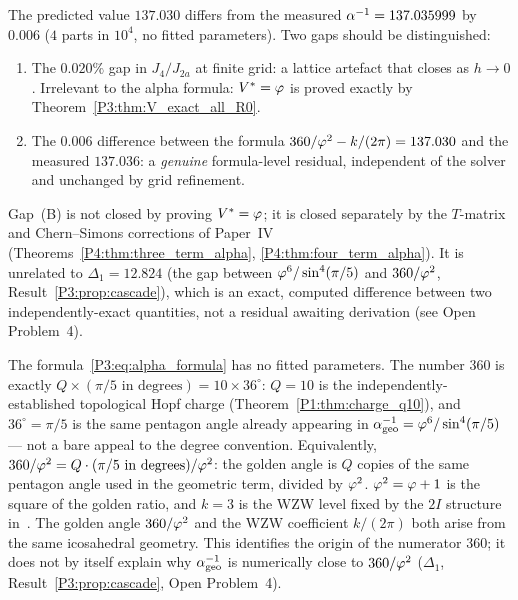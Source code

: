 \begin{remark}
\label{P3:rem:residual_status}
The predicted value $137.030$ differs from the measured $\alpha^{-1} = 137.035999$
by $0.006$ ($4$ parts in $10^4$, no fitted parameters).
Two gaps should be distinguished:
\begin{enumerate}[noitemsep,label=(\Alph*)]
  \item The $0.020\%$ gap in $J_4/J_{2a}$ at finite grid: a lattice artefact
    that closes as $h\to 0$.  Irrelevant to the alpha formula: $V^*=\varphi$ is
    proved exactly by Theorem~\ref{P3:thm:V_exact_all_R0}.
  \item The $0.006$ difference between the formula $360/\varphi^2 - k/(2\pi) = 137.030$
    and the measured $137.036$: a \emph{genuine} formula-level residual,
    independent of the solver and unchanged by grid refinement.
\end{enumerate}
Gap~(B) is not closed by proving $V^*=\varphi$; it is closed separately by
the $T$-matrix and Chern--Simons corrections of Paper~IV
(Theorems~\ref{P4:thm:three_term_alpha}, \ref{P4:thm:four_term_alpha}).
It is unrelated to $\Delta_1=12.824$ (the gap between
$\varphi^6/\sin^4(\pi/5)$ and $360/\varphi^2$, Result~\ref{P3:prop:cascade}),
which is an exact, computed difference between two independently-exact
quantities, not a residual awaiting derivation (see Open Problem~4).
\end{remark}

\begin{remark}
\label{P3:rem:no_fitted_params}
The formula~\eqref{P3:eq:alpha_formula} has no fitted parameters.
The number $360$ is exactly $Q\times(\pi/5\text{ in degrees}) = 10\times36^\circ$:
$Q=10$ is the independently-established topological Hopf charge
(Theorem~\ref{P1:thm:charge_q10}), and $36^\circ=\pi/5$ is the same
pentagon angle already appearing in $\alpha^{-1}_{\mathrm{geo}}=\varphi^6/\sin^4(\pi/5)$
--- not a bare appeal to the degree convention. Equivalently,
$360/\varphi^2 = Q\cdot(\pi/5\text{ in degrees})/\varphi^2$: the golden angle is
$Q$ copies of the same pentagon angle used in the geometric term, divided
by $\varphi^2$. $\varphi^2=\varphi+1$ is the square of the golden ratio, and $k=3$
is the WZW level fixed by the $2I$ structure in~\cite{Paper1}.
The golden angle $360/\varphi^2$ and the WZW coefficient $k/(2\pi)$
both arise from the same icosahedral geometry. This identifies the
origin of the numerator $360$; it does not by itself explain why
$\alpha^{-1}_{\mathrm{geo}}$ is numerically close to $360/\varphi^2$
($\Delta_1$, Result~\ref{P3:prop:cascade}, Open Problem~4).
\end{remark}

